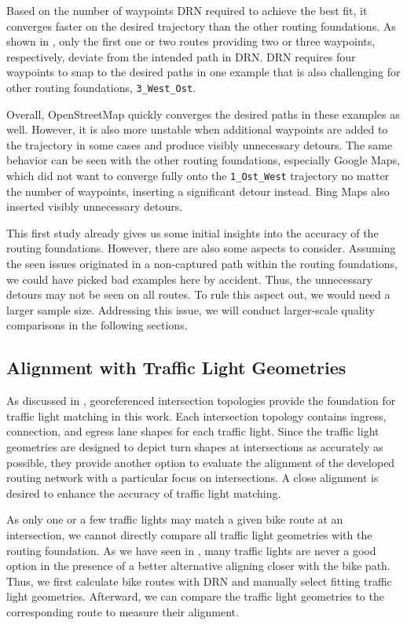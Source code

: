 Based on the number of waypoints DRN required to achieve the best fit, it converges faster on the desired trajectory than the other routing foundations. As shown in , only the first one or two routes providing two or three waypoints, respectively, deviate from the intended path in DRN. DRN requires four waypoints to snap to the desired paths in one example that is also challenging for other routing foundations, \texttt{3\_West\_Ost}.

Overall, OpenStreetMap quickly converges the desired paths in these examples as well. However, it is also more unstable when additional waypoints are added to the trajectory in some cases and produce visibly unnecessary detours. The same behavior can be seen with the other routing foundations, especially Google Maps, which did not want to converge fully onto the \texttt{1\_Ost\_West} trajectory no matter the number of waypoints, inserting a significant detour instead. Bing Maps also inserted visibly unnecessary detours. 

This first study already gives us some initial insights into the accuracy of the routing foundations. However, there are also some aspects to consider. Assuming the seen issues originated in a non-captured path within the routing foundations, we could have picked bad examples here by accident. Thus, the unnecessary detours may not be seen on all routes. To rule this aspect out, we would need a larger sample size. Addressing this issue, we will conduct larger-scale quality comparisons in the following sections.

\subsection{Alignment with Traffic Light Geometries} \label{sec:lorenz4}

As discussed in , georeferenced intersection topologies provide the foundation for traffic light matching in this work. Each intersection topology contains ingress, connection, and egress lane shapes for each traffic light. Since the traffic light geometries are designed to depict turn shapes at intersections as accurately as possible, they provide another option to evaluate the alignment of the developed routing network with a particular focus on intersections. A close alignment is desired to enhance the accuracy of traffic light matching.

As only one or a few traffic lights may match a given bike route at an intersection, we cannot directly compare all traffic light geometries with the routing foundation. As we have seen in , many traffic lights are never a good option in the presence of a better alternative aligning closer with the bike path. Thus, we first calculate bike routes with DRN and manually select fitting traffic light geometries. Afterward, we can compare the traffic light geometries to the corresponding route to measure their alignment. 

